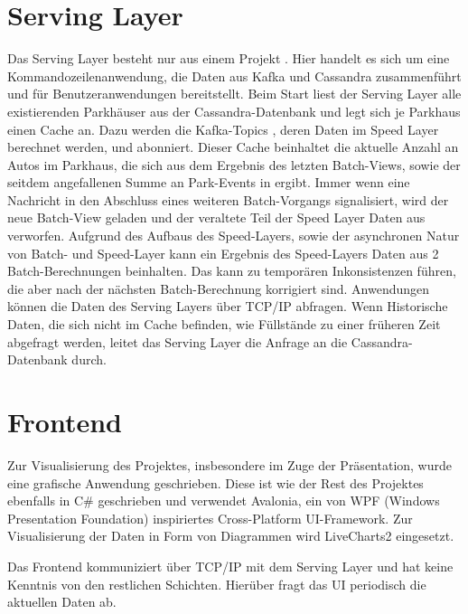 \section{Serving Layer}
Das Serving Layer besteht nur aus einem Projekt .
Hier handelt es sich um eine Kommandozeilenanwendung, die Daten aus Kafka und Cassandra zusammenführt und für Benutzeranwendungen bereitstellt.
Beim Start liest der Serving Layer alle existierenden Parkhäuser aus der Cassandra-Datenbank und legt sich je Parkhaus einen Cache an.
Dazu werden die Kafka-Topics , deren Daten im Speed Layer berechnet werden, und  abonniert.
Dieser Cache beinhaltet die aktuelle Anzahl an Autos im Parkhaus, die sich aus dem Ergebnis des letzten Batch-Views, sowie der seitdem angefallenen Summe an Park-Events in  ergibt.
Immer wenn eine Nachricht in  den Abschluss eines weiteren Batch-Vorgangs signalisiert, wird der neue Batch-View geladen und der veraltete Teil der Speed Layer Daten aus  verworfen.
Aufgrund des Aufbaus des Speed-Layers, sowie der asynchronen Natur von Batch- und Speed-Layer kann ein Ergebnis des Speed-Layers Daten aus 2 Batch-Berechnungen beinhalten.
Das kann zu temporären Inkonsistenzen führen, die aber nach der nächsten Batch-Berechnung korrigiert sind.
Anwendungen können die Daten des Serving Layers über TCP/IP abfragen.
Wenn Historische Daten, die sich nicht im Cache befinden, wie Füllstände zu einer früheren Zeit abgefragt werden, leitet das Serving Layer die Anfrage an die Cassandra-Datenbank durch.

\section{Frontend}

Zur Visualisierung des Projektes, insbesondere im Zuge der Präsentation, wurde eine grafische Anwendung geschrieben.
Diese ist wie der Rest des Projektes ebenfalls in C\# geschrieben und verwendet Avalonia, ein von WPF (Windows Presentation Foundation) inspiriertes Cross-Platform UI-Framework.
Zur Visualisierung der Daten in Form von Diagrammen wird LiveCharts2 eingesetzt.

Das Frontend kommuniziert über TCP/IP mit dem Serving Layer und hat keine Kenntnis von den restlichen Schichten.
Hierüber fragt das UI periodisch die aktuellen Daten ab.
